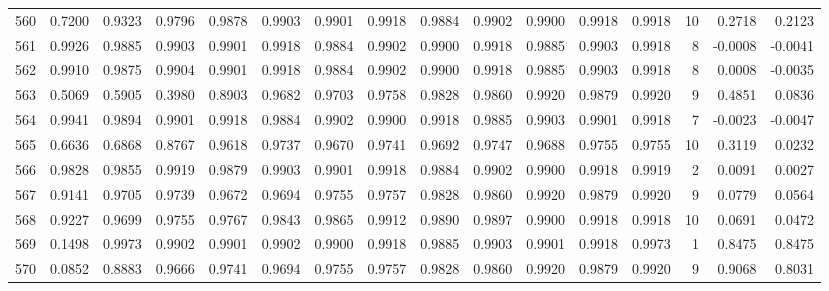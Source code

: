 \begin{tabular}{lrrrrrrrrrrrrrrr}
560 &      0.7200 &  0.9323 &  0.9796 &  0.9878 &  0.9903 &  0.9901 &  0.9918 &  0.9884 &  0.9902 &  0.9900 &   0.9918 &     0.9918 &     10 &                    0.2718 &                     0.2123 \\
561 &      0.9926 &  0.9885 &  0.9903 &  0.9901 &  0.9918 &  0.9884 &  0.9902 &  0.9900 &  0.9918 &  0.9885 &   0.9903 &     0.9918 &      8 &                   -0.0008 &                    -0.0041 \\
562 &      0.9910 &  0.9875 &  0.9904 &  0.9901 &  0.9918 &  0.9884 &  0.9902 &  0.9900 &  0.9918 &  0.9885 &   0.9903 &     0.9918 &      8 &                    0.0008 &                    -0.0035 \\
563 &      0.5069 &  0.5905 &  0.3980 &  0.8903 &  0.9682 &  0.9703 &  0.9758 &  0.9828 &  0.9860 &  0.9920 &   0.9879 &     0.9920 &      9 &                    0.4851 &                     0.0836 \\
564 &      0.9941 &  0.9894 &  0.9901 &  0.9918 &  0.9884 &  0.9902 &  0.9900 &  0.9918 &  0.9885 &  0.9903 &   0.9901 &     0.9918 &      7 &                   -0.0023 &                    -0.0047 \\
565 &      0.6636 &  0.6868 &  0.8767 &  0.9618 &  0.9737 &  0.9670 &  0.9741 &  0.9692 &  0.9747 &  0.9688 &   0.9755 &     0.9755 &     10 &                    0.3119 &                     0.0232 \\
566 &      0.9828 &  0.9855 &  0.9919 &  0.9879 &  0.9903 &  0.9901 &  0.9918 &  0.9884 &  0.9902 &  0.9900 &   0.9918 &     0.9919 &      2 &                    0.0091 &                     0.0027 \\
567 &      0.9141 &  0.9705 &  0.9739 &  0.9672 &  0.9694 &  0.9755 &  0.9757 &  0.9828 &  0.9860 &  0.9920 &   0.9879 &     0.9920 &      9 &                    0.0779 &                     0.0564 \\
568 &      0.9227 &  0.9699 &  0.9755 &  0.9767 &  0.9843 &  0.9865 &  0.9912 &  0.9890 &  0.9897 &  0.9900 &   0.9918 &     0.9918 &     10 &                    0.0691 &                     0.0472 \\
569 &      0.1498 &  0.9973 &  0.9902 &  0.9901 &  0.9902 &  0.9900 &  0.9918 &  0.9885 &  0.9903 &  0.9901 &   0.9918 &     0.9973 &      1 &                    0.8475 &                     0.8475 \\
570 &      0.0852 &  0.8883 &  0.9666 &  0.9741 &  0.9694 &  0.9755 &  0.9757 &  0.9828 &  0.9860 &  0.9920 &   0.9879 &     0.9920 &      9 &                    0.9068 &                     0.8031 \\

\end{tabular}
